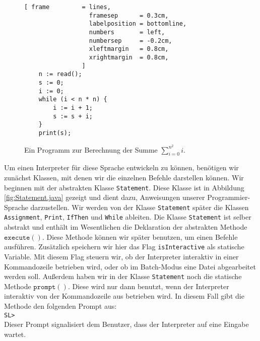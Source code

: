 \begin{figure}[!ht]
\centering
\begin{Verbatim}[ frame         = lines, 
                  framesep      = 0.3cm, 
                  labelposition = bottomline,
                  numbers       = left,
                  numbersep     = -0.2cm,
                  xleftmargin   = 0.8cm,
                  xrightmargin  = 0.8cm,
                ]
    n := read();
    s := 0;
    i := 0;
    while (i < n * n) {
        i := i + 1;
        s := s + i;
    }
    print(s);
\end{Verbatim}
\vspace*{-0.3cm}
\caption{Ein Programm zur Berechnung der Summe $\sum\limits_{i=0}^{n^2} i$.}
\label{fig:sum.sl}
\end{figure}



Um einen Interpreter f\"ur diese Sprache entwickeln zu k\"onnen, ben\"otigen wir
zun\"achst Klassen, mit denen wir die einzelnen Befehle darstellen k\"onnen.
Wir beginnen mit der abstrakten Klasse \texttt{Statement}.  Diese Klasse ist in Abbildung
\ref{fig:Statement.java} gezeigt und dient dazu,
Anweisungen unserer Programmier-Sprache darzustellen.
Wir werden von der Klasse \texttt{Statement} sp\"ater die Klassen
\texttt{Assignment}, \texttt{Print}, \texttt{IfThen} und \texttt{While} ableiten.
Die Klasse \texttt{Statement} ist selber abstrakt und enth\"alt 
im Wesentlichen die Deklaration der abstrakten Methode $\texttt{execute}()$.  Diese Methode
k\"onnen wir sp\"ater benutzen, um einen Befehle ausf\"uhren.
Zus\"atzlich speichern wir hier das Flag \texttt{isInteractive} als statische Variable.  Mit
diesem Flag steuern wir, ob der Interpreter interaktiv in einer Kommandozeile betrieben
wird, oder ob im Batch-Modus eine Datei abgearbeitet werden soll.  Au{\ss}erdem haben wir in der
Klasse \texttt{Statement} noch die statische Methode $\texttt{prompt}()$.  Diese wird nur
dann benutzt, wenn der Interpreter interaktiv von der Kommandozeile aus betrieben wird.
In diesem Fall gibt die Methode den folgenden Prompt aus:
\\[0.2cm]
\hspace*{1.3cm}
\texttt{SL> }
\\[0.2cm]
Dieser Prompt signalisiert dem Benutzer, dass der Interpreter auf eine Eingabe wartet.

